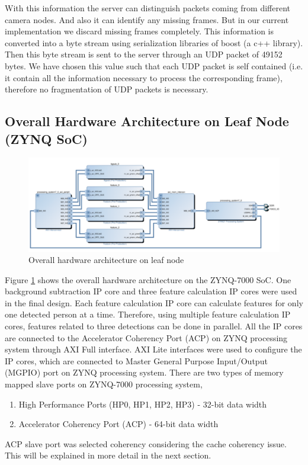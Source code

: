 \documentclass[12pt,a4paper]{report}
\begin{document}
With this information the server can distinguish packets coming from different camera nodes. And also it can identify any missing frames. But in our current implementation we discard missing frames completely. This information is converted into a byte stream using serialization libraries of boost (a c++ library). Then this byte stream is sent to the server through an UDP packet of 49152 bytes. We have chosen this value such that each UDP packet is self contained (i.e. it contain all the information necessary to process the corresponding frame), therefore no fragmentation of UDP packets is necessary.

\subsection{Overall Hardware Architecture on Leaf Node (ZYNQ SoC)}


\begin{figure}[H]
\includegraphics[width=\textwidth]{overallhardware}
\centering
\caption{Overall hardware architecture on leaf node}
\label{overallhardware}
\end{figure}


Figure \ref{overallhardware} shows the overall hardware architecture on the ZYNQ-7000 SoC. One background subtraction IP core and three feature calculation IP cores were used in the final design. Each feature calculation IP core can calculate features for only one detected person at a time. Therefore, using multiple feature calculation IP cores, features related to three detections can be done in parallel. All the IP cores are connected to the Accelerator Coherency Port (ACP) on ZYNQ processing system through AXI Full interface. AXI Lite interfaces were used to configure the IP cores, which are connected to Master General Purpose Input/Output (MGPIO) port on ZYNQ processing system. There are two types of memory mapped slave ports on ZYNQ-7000 processing system,
\begin{enumerate}
\item High Performance Ports (HP0, HP1, HP2, HP3) - 32-bit data width
\item Accelerator Coherency Port (ACP) - 64-bit data width
\end{enumerate}
ACP slave port was selected coherency considering the cache coherency issue. This will be explained in more detail in the next section.
\end{document}
